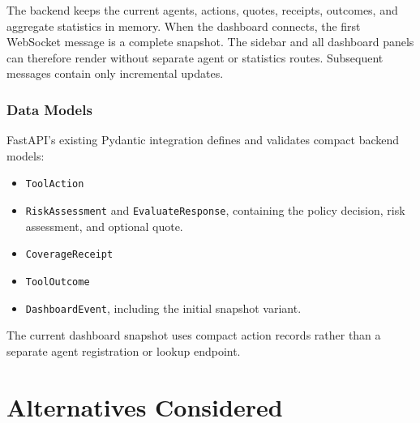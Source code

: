 \documentclass[11pt]{article}
\begin{document}
The backend keeps the current agents, actions, quotes, receipts, outcomes, and
aggregate statistics in memory. When the dashboard connects, the first
WebSocket message is a complete snapshot. The sidebar and all dashboard panels
can therefore render without separate agent or statistics routes. Subsequent
messages contain only incremental updates.

\subsubsection{Data Models}

FastAPI's existing Pydantic integration defines and validates compact backend
models:

\begin{itemize}[leftmargin=*]
  \item \texttt{ToolAction}
  \item \texttt{RiskAssessment} and \texttt{EvaluateResponse}, containing the
  policy decision, risk assessment, and optional quote.
  \item \texttt{CoverageReceipt}
  \item \texttt{ToolOutcome}
  \item \texttt{DashboardEvent}, including the initial snapshot variant.
\end{itemize}

The current dashboard snapshot uses compact action records rather than a
separate agent registration or lookup endpoint.

\section{Alternatives Considered}
\end{document}
